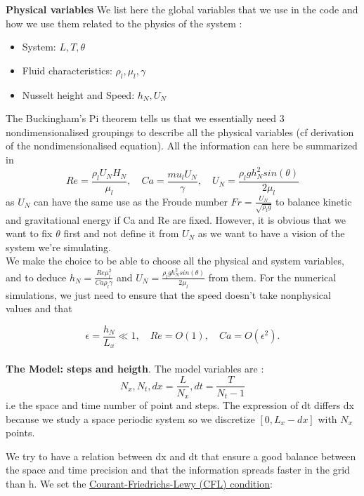 \documentclass[12pt]{article}
\begin{document}
\textbf{Physical variables}
 We list here the global variables that we use in the code and how we use them related to the physics of the system :

\begin{itemize}
    \item System: $L,T,\theta$
    \item Fluid characteristics: $\rho_l, \mu_l, \gamma$
    \item Nusselt height and Speed: $h_N, U_N$ 
\end{itemize}


The Buckingham's Pi theorem tells us that we essentially need 3 nondimensionalised groupings to describe all the physical variables (cf derivation of the nondimensionalised equation). All the information can here be summarized in $$Re = \frac{\rho_l U_N H_N}{\mu_l}, \quad Ca=\frac{mu_l U_N}{\gamma}, \quad U_N=\frac{\rho_l g h_N^2 sin(\theta)}{2\mu_l}$$ as $U_N$ can have the same use as the Froude number $Fr = \frac{U_N}{\sqrt{\rho_l g}}$ to balance kinetic and gravitational energy if Ca and Re are fixed. However, it is obvious that we want to fix $\theta$ first and not define it from $U_N$ as we want to have a vision of the system we're simulating. 
\\

We make the choice to be able to choose all the physical and system variables, and to deduce $h_N = \frac{Re \mu_l^2}{Ca\rho_l \gamma}$ and $U_N = \frac{\rho_l g h_N^2 sin(\theta)}{2\mu_l}$ from them. For the numerical simulations, we just need to ensure that the speed doesn't take nonphysical values and that 

\begin{equation}\label{num_scaling_conditions}
\epsilon = \frac{h_N}{L_x} \ll 1, \quad Re=O(1),\quad Ca=O(\epsilon^2).
\end{equation}
\\

\textbf{The Model: steps and heigth}. The model variables are : 
\begin{equation}
    N_x, N_t, dx = \frac{L}{N_x}, dt=\frac{T}{N_t -1}
\end{equation}
i.e the space and time number of point and steps. The expression of dt differs dx because we study a space periodic system so we discretize $[0, L_x-dx]$ with $N_x$ points.  

We try to have a relation between dx and dt that ensure a good balance between the space and time precision and that the information spreads faster in the grid than h. We set the \underline{Courant-Friedrichs-Lewy (CFL) condition}: 
\end{document}

